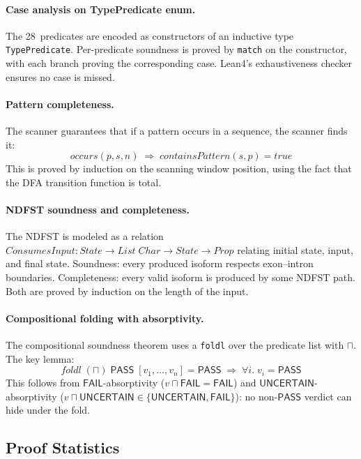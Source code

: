 \documentclass[acmsmall,review,anonymous]{acmart}
\newcommand{\PASS}{\ensuremath{\mathsf{PASS}}\xspace}
\newcommand{\FAIL}{\ensuremath{\mathsf{FAIL}}\xspace}
\newcommand{\UNCERTAIN}{\ensuremath{\mathsf{UNCERTAIN}}\xspace}
\newcommand{\tand}{\sqcap}
\begin{document}
\paragraph{Case analysis on TypePredicate enum.}
The 28~predicates are encoded as constructors of an inductive type
\texttt{TypePredicate}.
Per-predicate soundness is proved by \texttt{match} on the constructor,
with each branch proving the corresponding case.
Lean4's exhaustiveness checker ensures no case is missed.

\paragraph{Pattern completeness.}
The scanner guarantees that if a pattern occurs in a sequence, the
scanner finds it:
\[
  \mathit{occurs}(p, s, n) \;\Rightarrow\;
  \mathit{containsPattern}(s, p) = \mathit{true}
\]
This is proved by induction on the scanning window position,
using the fact that the DFA transition function is total.

\paragraph{NDFST soundness and completeness.}
The NDFST is modeled as a relation
$\mathit{ConsumesInput} : \mathit{State} \to \mathit{List}\;\mathit{Char}
 \to \mathit{State} \to \mathit{Prop}$
relating initial state, input, and final state.
Soundness: every produced isoform respects exon--intron boundaries.
Completeness: every valid isoform is produced by some NDFST path.
Both are proved by induction on the length of the input.

\paragraph{Compositional folding with absorptivity.}
The compositional soundness theorem uses a \texttt{foldl} over the
predicate list with $\tand$.
The key lemma:
\[
  \mathit{foldl}\;(\tand)\;\PASS\;[v_1, \ldots, v_n] = \PASS
  \;\Longrightarrow\;
  \forall i.\; v_i = \PASS
\]
This follows from \FAIL-absorptivity ($v \tand \FAIL = \FAIL$) and
\UNCERTAIN-absorptivity ($v \tand \UNCERTAIN \in \{\UNCERTAIN, \FAIL\}$):
no non-\PASS{} verdict can hide under the fold.

\subsection{Proof Statistics}\label{sec:proof-stats}
\end{document}
